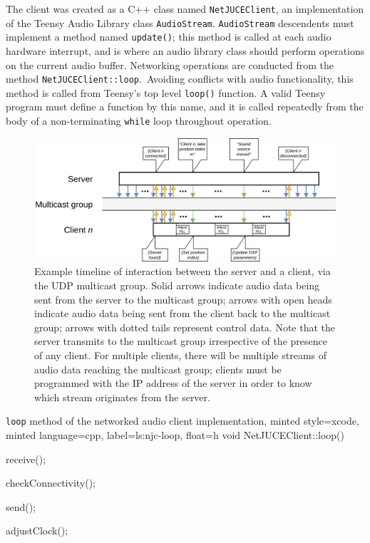 The client was created as a C++ class named \texttt{NetJUCEClient}, an
implementation of the Teensy Audio Library class \texttt{AudioStream}.
\texttt{AudioStream} descendents must implement a method named
\texttt{update()}; this method is called at each audio hardware interrupt, and
is where an audio library class should perform operations on the current
audio buffer.
Networking operations are conducted from the method
\texttt{NetJUCEClient::loop}.\
Avoiding conflicts with audio functionality, this method is called from Teensy's
top level \texttt{loop()} function.
A valid Teensy program must define a function by this name, and it is called
repeatedly from the body of a non-terminating \texttt{while} loop throughout
operation.

\begin{figure}[ht]
    \centering
    \includegraphics[width=\textwidth]{figures/timeline}
    \caption{
        Example timeline of interaction between the server and a client, via the
        UDP multicast group.
        Solid arrows indicate audio data being sent from the server to the
        multicast group;
        arrows with open heads indicate audio data being sent from the
        client back to the multicast group;
        arrows with dotted tails represent control data.
        Note that the server transmits to the multicast group irrespective of
        the presence of any client.
        For multiple clients, there will be multiple streams of audio data
        reaching the multicast group; clients must be programmed with the IP
        address of the server in order to know which stream originates from the
        server.
    }
    \label{fig:timeline}
\end{figure}

\begin{codelisting}{
    \texttt{loop} method of the networked audio client implementation,
    minted style=xcode,
    minted language=cpp,
    label=ls:njc-loop,
    float=h
}
    void NetJUCEClient::loop() {
        receive();

        checkConnectivity();

        send();

        adjustClock();
    }
\end{codelisting}

